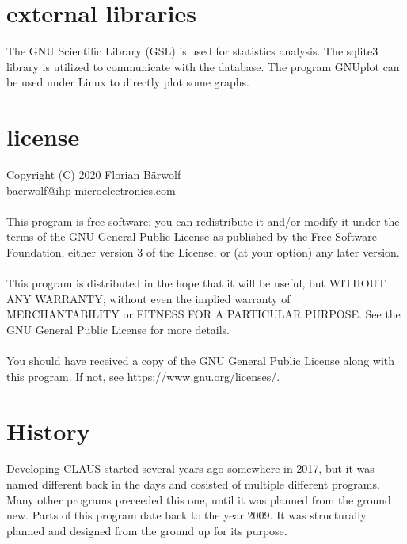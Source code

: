 \documentclass[a4paper,10pt]{article}
\begin{document}
\section{external libraries}
The GNU Scientific Library (GSL) is used for statistics analysis. The sqlite3 library is utilized to communicate with the database. The program GNUplot can be used under Linux to directly plot some graphs.

\section{license}
Copyright (C) 2020 Florian Bärwolf \\
baerwolf@ihp-microelectronics.com\\
\\
This program is free software: you can redistribute it and/or modify it under the terms of the GNU General Public License as published by the Free Software Foundation, either version 3 of the License, or (at your option) any later version. \\
\\
This program is distributed in the hope that it will be useful, but WITHOUT ANY WARRANTY; without even the implied warranty of MERCHANTABILITY or FITNESS FOR A PARTICULAR PURPOSE.  See the GNU General Public License for more details.\\
\\
You should have received a copy of the GNU General Public License along with this program.  If not, see https://www.gnu.org/licenses/.

\section{History}
Developing CLAUS started several years ago somewhere in 2017, but it was named different back in the days and cosisted of multiple different programs. Many other programs preceeded this one, until it was planned from the ground new. Parts of this program date back to the year 2009. It was structurally planned and designed from the ground up for its purpose.


\end{document}
